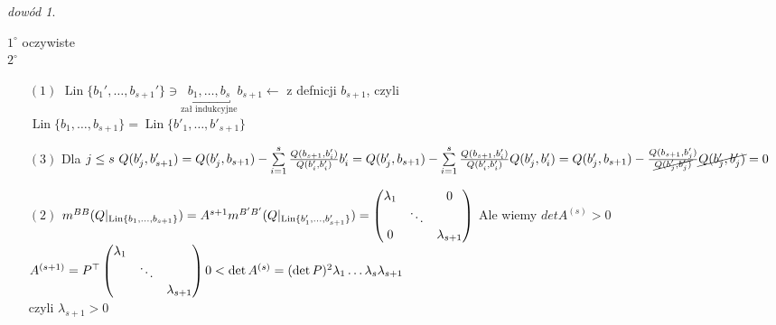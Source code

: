 \documentclass[10pt]{article}
\theoremstyle{definition}
\theoremstyle{definition}
\theoremstyle{definition}
\theoremstyle{definition}
\theoremstyle{remark}
\newtheorem*{dd}{dowód}
\theoremstyle{definition}
\theoremstyle{definition}
\theoremstyle{definition}
\theoremstyle{definition}
\theoremstyle{definition}
\begin{document}
\begin{dd}
\begin{itemize}
\begin{enumerate}
                            \end{enumerate} 
                            $1^\circ$ oczywiste \\ 
                            $2^\circ$ 
                            \begin{itemize} 
                                \item[$(1)$]$\operatorname{Lin}\{b_1',\ldots,b_{s+1}'\}\ni
                                    \underbracket{b_1,\ldots,b_s}_{\text{zał indukcyjne}}
                                    b_{s+1} \leftarrow$ z defnicji $b_{s+1}$, czyli \\ 
                                    $\operatorname{Lin}\{b_1,\ldots,b_{s+1}\}= 
                                    \operatorname{Lin}\{b'_1,\ldots,b'_{s+1}\}$ 
                                \item[$(3)$] Dla $j \le s \ Q(b_j',b_{s+1}') = 
                                    Q(b_j',b_{s+1}) - \sum\limits_{i=1}^s
                                    \frac{Q(b_{s+1},b_i')}{Q(b_i',b_i')}b_i'=Q(b_j',b_{s+1
                                    })-\sum\limits_{i=1}^s \frac{Q(b_{s+1},b_i')}{Q(b_i',
                                    b_i')}Q(b_j',b_i')=Q(b_j',b_{s+1})-\frac{Q(b_{s+1},
                                    b_j')}{\cancel{Q(b_j',b_j')}} \cancel{Q(b_j',b_j')}=0$
                                \item[$(2)$] $m^{BB} (Q|_{\operatorname{Lin}\{b_1,\ldots,
                                    b_{s+1}\}})=A^{s+1} \\ 
                                    m^{B'B'}(Q|_{\operatorname{Lin}\{b'_1,\ldots,
                                    b'_{s+1}\}})=\begin{pmatrix} \lambda_1 & & 0 \\ 
                                    & \ddots & \\ 0 & & \lambda_{s+1}\end{pmatrix} 
                                    $ Ale wiemy $det A^{(s)} > 0$ \\ 
                                        $A^{(s+1)} = P^\top \begin{pmatrix} \lambda_1 & &
                                            \\ & \ddots & \\& &\lambda_{s+1}\end{pmatrix}
                                    \\ 0 < \det A^{(s)} = (\det P)^2 \lambda_1 \ldots 
                                    \lambda_s \lambda_{s+1}$ \\ czyli $\lambda_{s+1} > 0$

\end{itemize}
\end{itemize}
\end{dd}
\end{document}
